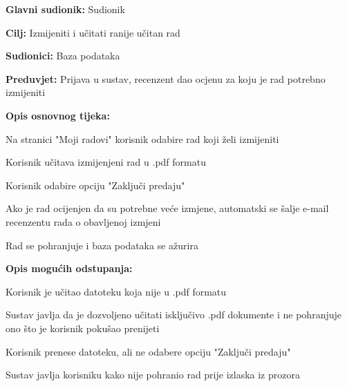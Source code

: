 					\noindent {}
					\begin{packed_item}
						\item \textbf{Glavni sudionik:} Sudionik
						\item \textbf{Cilj:} Izmijeniti i učitati ranije učitan rad
						\item \textbf{Sudionici:} Baza podataka
						\item \textbf{Preduvjet:} Prijava u sustav, recenzent dao ocjenu za koju je rad potrebno izmijeniti
						
						\item \textbf{Opis osnovnog tijeka:} 
						\item[] \begin{packed_enum}
							\item Na stranici "Moji radovi" korisnik odabire rad koji želi izmijeniti
							\item Korisnik učitava izmijenjeni rad u .pdf formatu
							\item Korisnik odabire opciju "Zaključi predaju"
							\item Ako je rad ocijenjen da su potrebne veće izmjene, automatski se šalje e-mail recenzentu rada o obavljenoj izmjeni
							\item Rad se pohranjuje i baza podataka se ažurira
						\end{packed_enum}
					
						\item \textbf{Opis mogućih odstupanja:}
						\item[] \begin{packed_enum}
							\item[2.a] Korisnik je učitao datoteku koja nije u .pdf formatu
							\item[] \begin{packed_enum}
								\item[1.] Sustav javlja da je dozvoljeno učitati isključivo .pdf dokumente i ne pohranjuje ono što je korisnik pokušao prenijeti
							\end{packed_enum}
						
							\item[2.b] Korisnik prenese datoteku, ali ne odabere opciju "Zaključi predaju"
							\item[] \begin{packed_enum}
								\item[1.] Sustav javlja korisniku kako nije pohranio rad prije izlaska iz prozora
							\end{packed_enum}
							
						\end{packed_enum}
					\end{packed_item}
					
